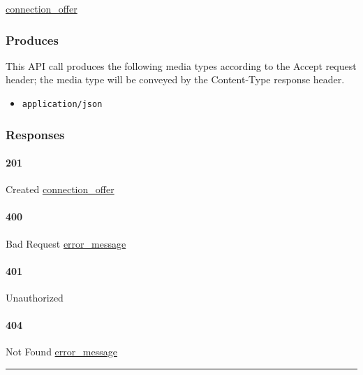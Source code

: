 \protect\hyperlink{connection_offer}{connection\_offer}

\hypertarget{produces-153}{%
\subsubsection{Produces}\label{produces-153}}

This API call produces the following media types according to the
{Accept} request header; the media type will be conveyed by the
{Content-Type} response header.

\begin{itemize}
\tightlist
\item
  \texttt{application/json}
\end{itemize}

\hypertarget{responses-158}{%
\subsubsection{Responses}\label{responses-158}}

\hypertarget{section-508}{%
\paragraph{201}\label{section-508}}

Created \protect\hyperlink{connection_offer}{connection\_offer}

\hypertarget{section-509}{%
\paragraph{400}\label{section-509}}

Bad Request \protect\hyperlink{error_message}{error\_message}

\hypertarget{section-510}{%
\paragraph{401}\label{section-510}}

Unauthorized \protect\hyperlink{}{}

\hypertarget{section-511}{%
\paragraph{404}\label{section-511}}

Not Found \protect\hyperlink{error_message}{error\_message}

\begin{center}\rule{0.5\linewidth}{\linethickness}\end{center}

